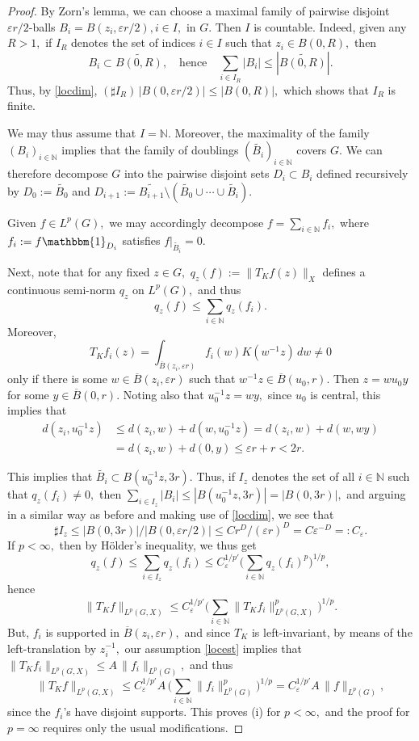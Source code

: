 \documentclass[leqno]{amsart}
\theoremstyle{definition}
\theoremstyle{remark}
\numberwithin{equation}{section}
\newcommand{\bbone}{{\mathbbm{1}}}
\newcommand{\eps}{\varepsilon}
\newcommand\bbN{{\mathbb {N}}}
\newcommand\ve{{\varepsilon}}
\newcommand{\chr}{\bbone}
\begin{document}
\begin{proof} 
By Zorn's lemma, we can choose a maximal family  of pairwise disjoint  $\eps r/2$-balls $B_i=B(z_i,\eps r/2), i\in I, $ in $G.$ Then $I$ is countable. Indeed, given any  $R>1,$ if $I_R$ denotes the set of indices $i\in I$ such that $z_i\in B(0,R),$ then
\[
B_i\subset \widetilde{B(0,R)},\quad\text{hence}\quad  \sum_{i\in I_R} |B_i| \le |\widetilde{B(0,R)}|.
\]
Thus, by \eqref{locdim}, $(\sharp I_R) \, |B(0,\eps r/2)|\le |B(0,R)|,$ which shows that $I_R$ is finite.

We may  thus assume that $I=\bbN.$ Moreover, the maximality of the  family $(B_i)_{i\in \bbN}$ implies that the family of doublings $(\widetilde{B_i})_{i\in \bbN}$ covers $G.$ We can therefore decompose $G$ into the pairwise disjoint sets $D_i\subset B_i$ defined recursively by $D_0:=\widetilde{B_0}$ and $D_{i+1}:=\widetilde{B_{i+1}}\setminus 
( \widetilde{B_{0}} \cup\cdots \cup\widetilde{B_{i}}).$

Given $f\in L^p(G),$ we may accordingly decompose $f=\sum_{i\in\bbN} f_i,$ where $f_i:=f\chr_{D_i}$ satisfies $f|_{\widetilde {B_i}}=0$.
 
Next, note that for any fixed $z\in G,$ $q_z(f):=\|T_K f(z)\|_X$ defines a continuous semi-norm $q_z$  on $L^p(G),$ and thus 
$$
q_z(f)\le \sum\limits_{i\in\bbN} q_z(f_i).
$$
Moreover, 
$$T_K f_i(z)=\int_{\overline B(z_i,\eps r)} f_i(w)K(w^{-1}z) \,dw\ne 0$$ 
only if there is some $w\in \overline B(z_i,\eps r)$ such that $w^{-1}z\in \overline{B}(u_0,r).$ Then $z=wu_0y$ for some $y\in \overline{B}(0,r).$  Noting also that $u_0^{-1}z=wy,$ since $u_0$ is central, this implies  that
\begin{align*}
d(z_i,u_0^{-1}z) &\le d(z_i,w)+d(w,u_0^{-1}z)= d(z_i,w)+d(w,wy)\\
 &= d(z_i,w)+d(0,y)\le  \eps r+r< 2r.
\end{align*}

This implies that $\widetilde {B_i}\subset B(u_0^{-1}z,3r).$ Thus, if $I_z$ denotes the set of all $i\in \bbN$ such that $q_z(f_i)\ne 0,$ then 
 $\sum_{i\in I_z} |B_i| \le |B(u_0^{-1}z,3r)|=|B(0,3r)|,$ and arguing in a similar way as before and making use of \eqref{locdim}, we see that 
 $$
 \sharp I_z\le |B(0,3r)|/|B(0,\eps r/2)|\le C r^D/(\ve r)^D=C \ve^{-D}=:C_\eps.
 $$
 If $p<\infty,$ then by Hölder's inequality, we thus get
 $$
q_z(f)\le \sum\limits_{i\in I_z} q_z(f_i)\le  C_\eps^{1/p'} \big(\sum\limits_{i\in \bbN} q_z(f_i)^p\big)^{1/p},
$$
hence 
$$
\|T_Kf\|_{L^p(G,X)}\le C_\eps^{1/p'} \big(\sum\limits_{i\in \bbN} \|T_K f_i\|_{L^p(G,X)}^p\big)^{1/p}.
$$
But, $f_i$ is supported in $\overline B(z_i, \ve r),$ and since $T_K$ is left-invariant,  by means of the left-translation by $z_i^{-1},$ our assumption \eqref{locest} implies that $\|T_Kf_i\|_{L^p(G,X)}\le A\, \|f_i\|_{L^p(G)} ,$ and thus 
$$
\|T_Kf\|_{L^p(G,X)}\le C_\eps^{1/p'} A\,\big(\sum\limits_{i\in \bbN} \|f_i\|_{L^p(G)}^p\big)^{1/p}=C_\eps^{1/p'} A\,\|f\|_{L^p(G)},
$$
since the $f_i$'s have disjoint supports. This proves (i) for $p<\infty,$ and the proof for $p=\infty$  requires only the usual  modifications.


\end{proof}
\end{document}
